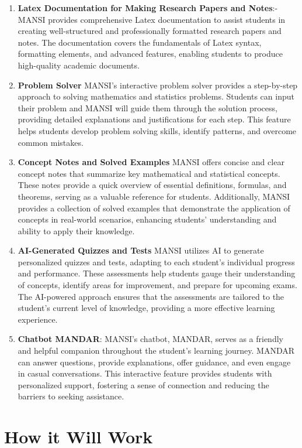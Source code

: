 \documentclass[20pt]{report}
\begin{document}
\begin{enumerate}

\item \textbf{Latex Documentation for Making Research Papers and Notes}:- MANSI provides comprehensive Latex documentation to assist students in creating well-structured and professionally formatted research papers and notes. The documentation covers the fundamentals of Latex syntax, formatting elements, and advanced features, enabling students to produce high-quality academic documents. 
\item \textbf{Problem Solver}
MANSI's interactive problem solver provides a step-by-step approach to solving mathematics and statistics problems. Students can input their problem and MANSI will guide them through the solution process, providing detailed explanations and justifications for each step. This feature helps students develop problem solving skills, identify patterns, and overcome common mistakes.

\item \textbf{Concept Notes and Solved Examples}
MANSI offers concise and clear concept notes that summarize key mathematical and statistical concepts. These notes provide a quick overview of essential definitions, formulas, and theorems, serving as a valuable reference for students. Additionally, MANSI provides a collection of solved examples that demonstrate the application of concepts in real-world scenarios, enhancing students' understanding and ability to apply their knowledge.

\item \textbf{AI-Generated Quizzes and Tests}
MANSI utilizes AI to generate personalized quizzes and tests, adapting to each student's individual progress and performance. These assessments help students gauge their understanding of concepts, identify areas for improvement, and prepare for upcoming exams. The AI-powered approach ensures that the assessments are tailored to the student's current level of knowledge, providing a more effective learning experience.
\item \textbf{Chatbot MANDAR}:
MANSI's chatbot, MANDAR, serves as a friendly and helpful companion throughout the student's learning journey. MANDAR can answer questions, provide explanations, offer guidance, and even engage in casual conversations. This interactive feature provides students with personalized support, fostering a sense of connection and reducing the barriers to seeking assistance.
\end{enumerate}
\section{How it Will Work}
\end{document}
